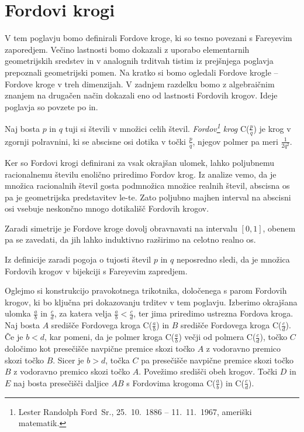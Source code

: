 \documentclass[mat1]{fmfdelo}
\begin{document}
\section{Fordovi krogi}

V tem poglavju bomo definirali Fordove kroge, ki so tesno povezani s Fareyevim zaporedjem. Večino lastnosti bomo dokazali z uporabo elementarnih geometrijskih sredstev in v analognih trditvah tistim iz prejšnjega poglavja prepoznali geometrijski pomen. Na kratko si bomo ogledali Fordove krogle -- Fordove kroge v treh dimenzijah. V zadnjem razdelku bomo z algebraičnim znanjem na drugačen način dokazali eno od lastnosti Fordovih krogov.
Ideje poglavja so povzete po \cite[poglavje 4]{fareyproject} in\cite{ford}.

\begin{definicija}
Naj bosta $p$ in $q$ tuji si števili v množici celih števil.
\emph{Fordov\footnote{Lester Randolph Ford~Sr., 25.\ 10.\ 1886 -- 11.\ 11.\ 1967, ameriški matematik.} krog} C($\frac{p}{q}$) je krog v zgornji polravnini, ki se abscisne osi dotika v točki $\frac{p}{q}$, njegov polmer pa meri $\frac{1}{2q^2}$. 
\end{definicija}


Ker so Fordovi krogi definirani za vsak okrajšan ulomek, lahko poljubnemu racionalnemu številu enolično priredimo Fordov krog. Iz analize vemo, da je množica racionalnih števil gosta podmnožica množice realnih števil, abscisna os pa je geometrijska predstavitev le-te. Zato poljubno majhen interval na abscisni osi vsebuje neskončno mnogo dotikališč Fordovih krogov.

Zaradi simetrije je Fordove kroge dovolj obravnavati na intervalu $[0,1]$, obenem pa se zavedati, da jih lahko induktivno razširimo na celotno realno os.

\begin{opomba}
Iz definicije zaradi pogoja o tujosti števil $p$ in $q$ neposredno sledi, da je množica Fordovih krogov v bijekciji s Fareyevim zapredjem.
\end{opomba}

Oglejmo si konstrukcijo pravokotnega trikotnika, določenega s parom Fordovih krogov, ki bo ključna pri dokazovanju trditev v tem poglavju. Izberimo okrajšana ulomka $\frac{a}{b}$ in $\frac{c}{d}$, za katera velja $\frac{a}{b} < \frac{c}{d}$, ter jima priredimo ustrezna Fordova kroga. Naj bosta $A$ središče Fordovega kroga C($\frac{a}{b}$) in $B$ središče Fordovega kroga C($\frac{c}{d}$). Če je $b<d$, kar pomeni, da je polmer kroga C($\frac{a}{b}$) večji od polmera C($\frac{c}{d}$), točko $C$ določimo kot presečišče navpične premice skozi točko $A$ z vodoravno premico skozi točko $B$. Sicer je $b>d$, točka $C$ pa presečišče navpične premice skozi točko $B$ z vodoravno premico skozi točko $A$. Povežimo središči obeh krogov. Točki $D$ in $E$ naj bosta presečišči daljice $AB$ s Fordovima krogoma C($\frac{a}{b}$) in C($\frac{c}{d}$).
\end{document}
